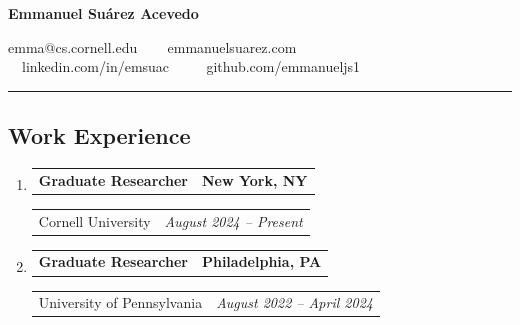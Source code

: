 \documentclass[letterpaper]{article}
\makeatletter
\newif\iflong
\newcommand*{\tabulardef}[3]{\begin{tabular}[t]{@{}lp{\dimexpr\linewidth-#1}@{}}
    #2&#3
\end{tabular}}
\newcommand{\headerrow}[2]
{\begin{tabular*}{\linewidth}{l@{\extracolsep{\fill}}r}
	#1 &
	#2 \\
\end{tabular*}}
\makeatother
\begin{document}
\begin{center}
{\LARGE \textbf{Emmanuel Suárez Acevedo}}

emma@cs.cornell.edu \ \textbullet
\ \ emmanuelsuarez.com \\

\ \ linkedin.com/in/emsuac \ \ \textbullet
\ \ github.com/emmanueljs1\\
\end{center}

\hrule
\subsection*{Work Experience}

\begin{enumerate}[label=]
	\parskip=-0.05em

	\item
		\headerrow
			{\textbf{Graduate Researcher}}
			{\textbf{New York, NY}}
	\headerrow
        {Cornell University}
        {\emph{August 2024 -- Present}}
    \iflong
	\begin{enumerate}[label= *]
	\parskip=-0.1em
\item\tabulardef{4cm}{}{Developing formal verification techniques for randomized concurrent systems with fair scheduling guarantees, targeting correctness of distributed consensus protocols}
        \item\tabulardef{4cm}{}{Designed programming language for automated verification of
            quantitative network behavior (e.g., \emph{is all traffic delivered within 9ms?})
            and presented paper at PLDI 2026}
	\end{enumerate}
    \fi

	\item
		\headerrow
			{\textbf{Graduate Researcher}}
			{\textbf{Philadelphia, PA}}
	\headerrow
        {University of Pennsylvania}
        {\emph{August 2022 -- April 2024}}
    \iflong
	\begin{enumerate}[label= *]
	\parskip=-0.1em
\item\tabulardef{4cm}{}{Developed type system for statically tracking computational effects and resource demands, proving dead code elimination preserves program behavior (OOPSLA 2024)}
	\end{enumerate}
    \fi


\end{enumerate}
\end{document}

